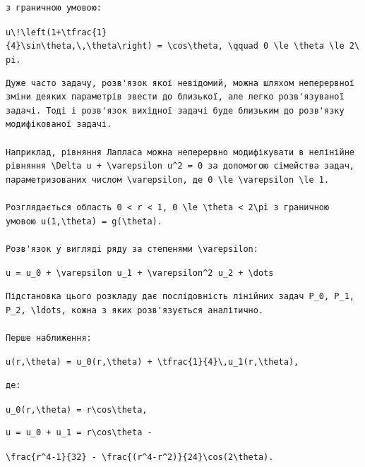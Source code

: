 \documentclass[
  ukrainian,
]{article}
\begin{document}
\begin{verbatim}
з граничною умовою:
\end{verbatim}

\texttt{u\textbackslash{}!\textbackslash{}left(1+\textbackslash{}tfrac\{1\}\{4\}\textbackslash{}sin\textbackslash{}theta,\textbackslash{},\textbackslash{}theta\textbackslash{}right)\ =\ \textbackslash{}cos\textbackslash{}theta,\ \textbackslash{}qquad\ 0\ \textbackslash{}le\ \textbackslash{}theta\ \textbackslash{}le\ 2\textbackslash{}pi.}

\begin{verbatim}
Дуже часто задачу, розв'язок якої невідомий, можна шляхом неперервної зміни деяких параметрів звести до близької, але легко розв'язуваної задачі. Тоді і розв'язок вихідної задачі буде близьким до розв'язку модифікованої задачі.

Наприклад, рівняння Лапласа можна неперервно модифікувати в нелінійне рівняння \Delta u + \varepsilon u^2 = 0 за допомогою сімейства задач, параметризованих числом \varepsilon, де 0 \le \varepsilon \le 1.

Розглядається область 0 < r < 1, 0 \le \theta < 2\pi з граничною умовою u(1,\theta) = g(\theta).

Розв'язок у вигляді ряду за степенями \varepsilon:
\end{verbatim}

\texttt{u\ =\ u\_0\ +\ \textbackslash{}varepsilon\ u\_1\ +\ \textbackslash{}varepsilon\^{}2\ u\_2\ +\ \textbackslash{}dots}

\begin{verbatim}
Підстановка цього розкладу дає послідовність лінійних задач P_0, P_1, P_2, \ldots, кожна з яких розв'язується аналітично.

Перше наближення:
\end{verbatim}

\texttt{u(r,\textbackslash{}theta)\ =\ u\_0(r,\textbackslash{}theta)\ +\ \textbackslash{}tfrac\{1\}\{4\}\textbackslash{},u\_1(r,\textbackslash{}theta),}

\begin{verbatim}
де:
\end{verbatim}

\texttt{u\_0(r,\textbackslash{}theta)\ =\ r\textbackslash{}cos\textbackslash{}theta,}

\begin{verbatim}
u = u_0 + u_1 = r\cos\theta -
\end{verbatim}

\texttt{\textbackslash{}frac\{r\^{}4-1\}\{32\}\ -\ \textbackslash{}frac\{(r\^{}4-r\^{}2)\}\{24\}\textbackslash{}cos(2\textbackslash{}theta).}
\end{document}
